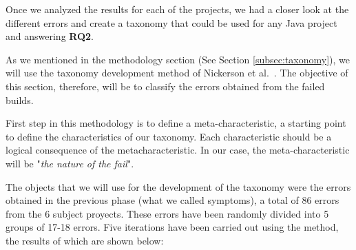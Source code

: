 Once we analyzed the results for each of the projects, we had a closer look at the different errors and create a taxonomy that could be used for any Java project and answering \textbf{RQ2}.

As we mentioned in the methodology section (See Section \ref{subsec:taxonomy}), we will use the taxonomy development method of Nickerson et al.~\cite{Nickerson2013}. The objective of this section, therefore, will be to classify the errors obtained from the failed builds.

First step in this methodology is to define a meta-characteristic, a starting point to define the characteristics of our taxonomy. Each characteristic should be a logical consequence of the metacharacteristic. In our case, the meta-characteristic will be "\textit{the nature of the fail}". 

The objects that we will use for the development of the taxonomy were the errors obtained in the previous phase (what we called symptoms), a total of 86 errors from the 6 subject proyects. These errors have been randomly divided into 5 groups of 17-18 errors. Five iterations have been carried out using the method, the results of which are shown below:

